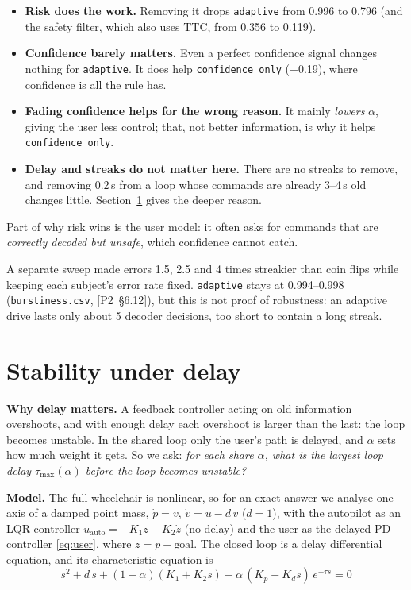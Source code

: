 \documentclass[11pt,a4paper]{article}
\newcommand{\ptwo}[1]{{\small\textsf{[P2~\S#1]}}}
\newcommand{\code}[1]{\texttt{#1}}
\newcommand{\ua}{u_{\mathrm{auto}}}
\newcommand{\TTC}{\mathrm{TTC}}
\begin{document}
\begin{itemize}\setlength{\itemsep}{2pt}
\item \textbf{Risk does the work.} Removing it drops \code{adaptive} from
0.996 to 0.796 (and the safety filter, which also uses $\TTC$, from 0.356
to 0.119).
\item \textbf{Confidence barely matters.} Even a perfect confidence signal
changes nothing for \code{adaptive}. It does help \code{confidence\_only}
(+0.19), where confidence is all the rule has.
\item \textbf{Fading confidence helps for the wrong reason.} It mainly
\emph{lowers} $\alpha$, giving the user less control; that, not better
information, is why it helps \code{confidence\_only}.
\item \textbf{Delay and streaks do not matter here.} There are no streaks
to remove, and removing 0.2\,s from a loop whose commands are already
3--4\,s old changes little. Section~\ref{sec:stability} gives the deeper
reason.
\end{itemize}
Part of why risk wins is the user model: it often asks for commands that
are \emph{correctly decoded but unsafe}, which confidence cannot catch.

A separate sweep made errors 1.5, 2.5 and 4 times streakier than coin
flips while keeping each subject's error rate fixed. \code{adaptive}
stays at 0.994--0.998 (\code{burstiness.csv}, \ptwo{6.12}), but this is
not proof of robustness: an adaptive drive lasts only about 5 decoder
decisions, too short to contain a long streak.

\section{Stability under delay}
\label{sec:stability}

\textbf{Why delay matters.} A feedback controller acting on old
information overshoots, and with enough delay each overshoot is larger
than the last: the loop becomes unstable. In the shared loop only the
user's path is delayed, and $\alpha$ sets how much weight it gets. So we
ask: \emph{for each share $\alpha$, what is the largest loop delay
$\tau_{\max}(\alpha)$ before the loop becomes unstable?}

\textbf{Model.} The full wheelchair is nonlinear, so for an exact answer
we analyse one axis of a damped point mass, $\dot p = v$,
$\dot v = u - d\,v$ ($d = 1$), with the autopilot as an LQR controller
$\ua = -K_1 z - K_2\dot z$ (no delay) and the user as the delayed PD
controller \eqref{eq:user}, where $z = p - \text{goal}$. The closed loop
is a delay differential equation, and its characteristic equation is
\begin{equation}
\boxed{\;s^2 + d\,s + (1-\alpha)(K_1 + K_2 s) + \alpha\,(K_p + K_d s)\,e^{-\tau s} = 0\;}
\label{eq:char}
\end{equation}
\end{document}
